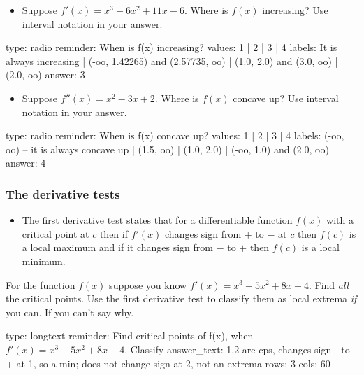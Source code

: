 \documentclass[12pt]{article}
\begin{document}
\begin{itemize}
\itemsep1pt\parskip0pt
\item
  Suppose $f'(x) = x^3 - 6x^2 + 11x - 6$. Where is $f(x)$ increasing?
  Use interval notation in your answer.
\end{itemize}

\begin{answer}
type: radio
reminder: When is f(x) increasing?
values: 1 | 2 | 3 | 4
labels: It is always increasing | (-oo, 1.42265) and (2.57735, oo) | (1.0, 2.0) and (3.0, oo) | (2.0, oo)
answer: 3
\end{answer}

\begin{itemize}
\itemsep1pt\parskip0pt
\item
  Suppose $f''(x) = x^2 - 3x + 2$. Where is $f(x)$ concave up? Use
  interval notation in your answer.
\end{itemize}

\begin{answer}
type: radio
reminder: When is f(x) concave up?
values: 1 | 2 | 3 | 4
labels: (-oo, oo) -- it is always concave up | (1.5, oo) | (1.0, 2.0) | (-oo, 1.0) and (2.0, oo)
answer: 4
\end{answer}

\subsubsection{The derivative tests}

\begin{itemize}
\itemsep1pt\parskip0pt
\item
  The first derivative test states that for a differentiable function
  $f(x)$ with a critical point at $c$ then if $f'(x)$ changes sign from
  $+$ to $-$ at $c$ then $f(c)$ is a local maximum and if it changes
  sign from $-$ to $+$ then $f(c)$ is a local minimum.
\end{itemize}

For the function $f(x)$ suppose you know $f'(x)=x^3 - 5x^2 + 8x - 4$.
Find \emph{all} the critical points. Use the first derivative test to
classify them as local extrema \emph{if} you can. If you can't say why.

\begin{answer}
type: longtext
reminder: Find critical points of f(x), when \( f'(x)=x^3 - 5x^2 + 8x -4 \). Classify
answer_text: 1,2 are cps, changes sign - to + at 1, so a min; does not change sign at 2, not an extrema 
rows: 3
cols: 60
\end{answer}
\end{document}
